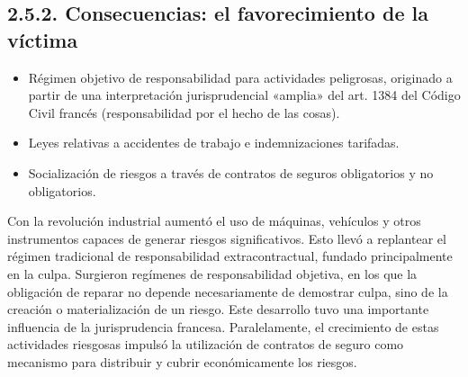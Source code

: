 \subsection{2.5.2. Consecuencias: el favorecimiento de la víctima}
\begin{itemize}
\item Régimen objetivo de responsabilidad para actividades peligrosas, originado a partir de una interpretación jurisprudencial «amplia» del art. 1384 del Código Civil francés (responsabilidad por el hecho de las cosas).
\item Leyes relativas a accidentes de trabajo e indemnizaciones tarifadas.
\item Socialización de riesgos a través de contratos de seguros obligatorios y no obligatorios.
\end{itemize}
Con la revolución industrial aumentó el uso de máquinas, vehículos y otros instrumentos capaces de generar riesgos significativos. Esto llevó a replantear el régimen tradicional de responsabilidad extracontractual, fundado principalmente en la culpa. Surgieron regímenes de responsabilidad objetiva, en los que la obligación de reparar no depende necesariamente de demostrar culpa, sino de la creación o materialización de un riesgo. Este desarrollo tuvo una importante influencia de la jurisprudencia francesa. Paralelamente, el crecimiento de estas actividades riesgosas impulsó la utilización de contratos de seguro como mecanismo para distribuir y cubrir económicamente los riesgos.

